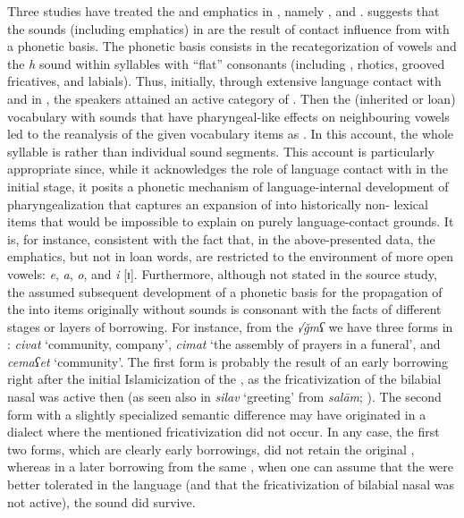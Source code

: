 \documentclass[output=paper]{langsci/langscibook}
\begin{document}
Three studies have treated the  and emphatics in , namely \citet{Kahn1976}, \citet{Anonbyforthcoming} and \citet{Barryforthcoming}. \citet{Barryforthcoming} suggests that the  sounds (including emphatics) in  are the result of contact influence from  with a phonetic basis. The phonetic basis consists in the recategorization of vowels and the \textit{h} sound within syllables with “flat” consonants (including , rhotics, grooved fricatives, and labials). Thus, initially, through extensive language contact with and  in , the speakers attained an active category of . Then the (inherited or loan) vocabulary with sounds that have pharyngeal-like effects on neighbouring vowels led to the reanalysis of the given vocabulary items as . In this account, the whole syllable is  rather than individual sound segments. This account is particularly appropriate since, while it acknowledges the role of language contact with  in the initial stage, it posits a phonetic mechanism of language-internal development of pharyngealization that captures an expansion of  into historically non- lexical items that would be impossible to explain on purely language-contact grounds. It is, for instance, consistent with the fact that, in the above-presented data, the emphatics, but not  in loan words, are restricted to the environment of more open vowels: \textit{e}, \textit{a}, \textit{o}, and \textit{i} [ɪ]. Furthermore, although not stated in the source study, the assumed subsequent development of a phonetic basis for the propagation of the  into items originally without  sounds is consonant with the facts of different stages or layers of borrowing. For instance, from the   \textit{√ǧmʕ} we have three forms in : \textit{civat} ‘community, company’, \textit{cimat} ‘the assembly of prayers in a funeral’, and \textit{cemaʕet} ‘community’. The first form is probably the result of an early borrowing right after the  initial Islamicization of the , as the fricativization of the bilabial nasal was active then (as seen also in \textit{silav} ‘greeting’ from  \textit{salām}; \citealt{Paul2008}). The second form with a slightly specialized semantic difference may have originated in a dialect where the mentioned fricativization did not occur. In any case, the first two forms, which are clearly early borrowings, did not retain the original , whereas in a later borrowing from the same , when one can assume that the  were better tolerated in the language (and that the fricativization of bilabial nasal was not active), the  sound did survive.   
\end{document}
